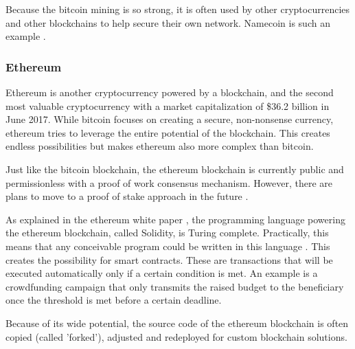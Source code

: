 Because the bitcoin mining is so strong, it is often used by other cryptocurrencies and other blockchains to help secure their own network. Namecoin is such an example \cite{namecoin-whitepaper}.

\subsubsection{Ethereum}

Ethereum is another cryptocurrency powered by a blockchain, and the second most valuable cryptocurrency with a market capitalization of \$36.2 billion in June 2017. While bitcoin focuses on creating a secure, non-nonsense currency, ethereum tries to leverage the entire potential of the blockchain. This creates endless possibilities but makes ethereum also more complex than bitcoin.

Just like the bitcoin blockchain, the ethereum blockchain is currently public and permissionless with a proof of work consensus mechanism. However, there are plans to move to a proof of stake approach in the future \cite{ethereum-pos-faq}. 

As explained in the ethereum white paper \cite{ethereum-whitepaper}, the programming language powering the ethereum blockchain, called Solidity, is Turing complete. Practically, this means that any conceivable program could be written in this language \cite{definition-turing-completeness}. This creates the possibility for smart contracts. These are transactions that will be executed automatically only if a certain condition is met. An example is a crowdfunding campaign that only transmits the raised budget to the beneficiary once the threshold is met before a certain deadline.

Because of its wide potential, the source code of the ethereum blockchain is often copied (called 'forked'), adjusted and redeployed for custom blockchain solutions. 

